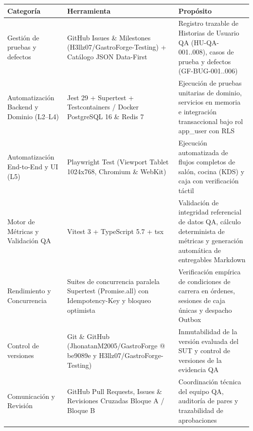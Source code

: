 \documentclass[10pt,a4paper]{article}
\newcounter{none}
\begin{document}
{\def\LTcaptype{none} %
\begin{longtable}[]{@{}
  >{\raggedright\arraybackslash}p{}
  >{\raggedright\arraybackslash}p{}
  >{\raggedright\arraybackslash}p{}@{}}
\toprule\noalign{}
\begin{minipage}[b]{\linewidth}\raggedright
Categoría
\end{minipage} & \begin{minipage}[b]{\linewidth}\raggedright
Herramienta
\end{minipage} & \begin{minipage}[b]{\linewidth}\raggedright
Propósito
\end{minipage} \\
\midrule\noalign{}
\endhead
\bottomrule\noalign{}
\endlastfoot
Gestión de pruebas y defectos & GitHub Issues \& Milestones (H3llz07/GastroForge-Testing) + Catálogo JSON Data-First & Registro trazable de Historias de Usuario QA (HU-QA-001..008), casos de prueba y defectos (GF-BUG-001..006) \\
Automatización Backend y Dominio (L2--L4) & Jest 29 + Supertest + Testcontainers / Docker PostgreSQL 16 \& Redis 7 & Ejecución de pruebas unitarias de dominio, servicios en memoria e integración transaccional bajo rol app\_user con RLS \\
Automatización End-to-End y UI (L5) & Playwright Test (Viewport Tablet 1024x768, Chromium \& WebKit) & Ejecución automatizada de flujos completos de salón, cocina (KDS) y caja con verificación táctil \\
Motor de Métricas y Validación QA & Vitest 3 + TypeScript 5.7 + tsx & Validación de integridad referencial de datos QA, cálculo determinista de métricas y generación automática de entregables Markdown \\
Rendimiento y Concurrencia & Suites de concurrencia paralela Supertest (Promise.all) con Idempotency-Key y bloqueo optimista & Verificación empírica de condiciones de carrera en órdenes, sesiones de caja únicas y despacho Outbox \\
Control de versiones & Git \& GitHub (JhonatanM2005/GastroForge @ be9089e y H3llz07/GastroForge-Testing) & Inmutabilidad de la versión evaluada del SUT y control de versiones de la evidencia QA \\
Comunicación y Revisión & GitHub Pull Requests, Issues \& Revisiones Cruzadas Bloque A / Bloque B & Coordinación técnica del equipo QA, auditoría de pares y trazabilidad de aprobaciones \\
\end{longtable}
}
\end{document}
